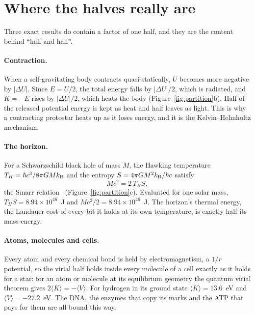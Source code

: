 \section{Where the halves really are}

Three exact results do contain a factor of one half, and they are the content behind ``half and
half''.

\paragraph{Contraction.} When a self-gravitating body contracts quasi-statically, $U$ becomes more
negative by $|\Delta U|$. Since $E=U/2$, the total energy falls by $|\Delta U|/2$, which is radiated,
and $K=-E$ rises by $|\Delta U|/2$, which heats the body (Figure~\ref{fig:partition}b). Half of the
released potential energy is kept as heat and half leaves as light. This is why a contracting
protostar heats up as it loses energy, and it is the Kelvin--Helmholtz mechanism. \derived

\paragraph{The horizon.} For a Schwarzschild black hole of mass $M$, the Hawking temperature
$T_H=\hbar c^3/8\pi GMk_{\mathrm B}$ and the entropy $S=4\pi GM^2k_{\mathrm B}/\hbar c$ satisfy
\begin{equation}
  Mc^2=2\,T_HS ,
  \label{eq:smarr}
\end{equation}
the Smarr relation~\cite{Smarr1973} (Figure~\ref{fig:partition}c). Evaluated for one solar mass,
$T_HS=8.94\times10^{46}$~J and $Mc^2/2=8.94\times10^{46}$~J. \calc{} The horizon's thermal energy,
the Landauer cost of every bit it holds at its own temperature, is exactly half its mass-energy.

\paragraph{Atoms, molecules and cells.} Every atom and every chemical bond is held by electromagnetism, a $1/r$ potential, so the
virial half holds inside every molecule of a cell exactly as it holds for a star: for an atom or molecule at its equilibrium
geometry the quantum virial theorem gives $2\langle K\rangle=-\langle V\rangle$. For hydrogen in its ground state $\langle K\rangle=13.6$~eV and
$\langle V\rangle=-27.2$~eV. \derived{} The DNA, the enzymes that copy its marks and the ATP that pays for them are all
bound this way.

